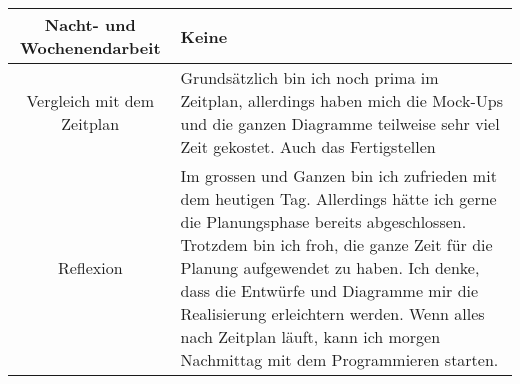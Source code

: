 \begin{tabularx}{\textwidth}[H]{|c|X|}
    Nacht- und Wochenendarbeit &
    Keine
    \\ \hline

    Vergleich mit dem Zeitplan &
    Grundsätzlich bin ich noch prima im Zeitplan, allerdings haben mich die Mock-Ups und die ganzen Diagramme teilweise
    sehr viel Zeit gekostet. Auch das Fertigstellen
    \\ \hline

    Reflexion &
    Im grossen und Ganzen bin ich zufrieden mit dem heutigen Tag. Allerdings hätte ich gerne die Planungsphase bereits abgeschlossen.
    Trotzdem bin ich froh, die ganze Zeit für die Planung aufgewendet zu haben. Ich denke,
    dass die Entwürfe und Diagramme mir die Realisierung erleichtern werden. Wenn alles nach Zeitplan läuft,
    kann ich morgen Nachmittag mit dem Programmieren starten.
    \\ \hline
\end{tabularx}
